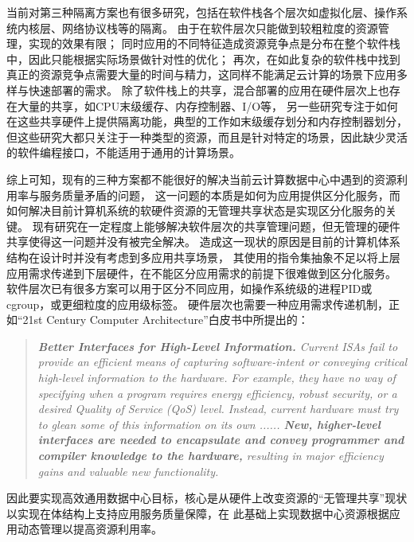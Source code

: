 当前对第三种隔离方案也有很多研究，包括在软件栈各个层次如虚拟化层\cite{}、操作系统内核层\cite{}、网络协议栈\cite{}等的隔离。
由于在软件层次只能做到较粗粒度的资源管理，实现的效果有限；
同时应用的不同特征造成资源竞争点是分布在整个软件栈中，因此只能根据实际场景做针对性的优化；
再次，在如此复杂的软件栈中找到真正的资源竞争点需要大量的时间与精力，这同样不能满足云计算的场景下应用多样与快速部署的需求。
除了软件栈上的共享，混合部署的应用在硬件层次上也存在大量的共享，如CPU末级缓存、内存控制器、I/O等，
另一些研究专注于如何在这些共享硬件上提供隔离功能，典型的工作如末级缓存划分\cite{}和内存控制器划分\cite{}，
但这些研究大都只关注于一种类型的资源，而且是针对特定的场景，因此缺少灵活的软件编程接口，不能适用于通用的计算场景。

综上可知，现有的三种方案都不能很好的解决当前云计算数据中心中遇到的资源利用率与服务质量矛盾的问题，
这一问题的本质是如何为应用提供区分化服务，而如何解决目前计算机系统的软硬件资源的无管理共享状态是实现区分化服务的关键。
现有研究在一定程度上能够解决软件层次的共享管理问题，但无管理的硬件共享使得这一问题并没有被完全解决。
造成这一现状的原因是目前的计算机体系结构在设计时并没有考虑到多应用共享场景，
其使用的指令集抽象不足以将上层应用需求传递到下层硬件，在不能区分应用需求的前提下很难做到区分化服务。
软件层次已有很多方案可以用于区分不同应用，如操作系统级的进程PID或cgroup，或更细粒度的应用级标签。%
硬件层次也需要一种应用需求传递机制，正如“21st Century Computer Architecture”白皮书中所提出的：

\begin{quotation} 
\emph{\textbf{Better Interfaces for High-Level Information.}
Current ISAs fail to provide an efficient means of capturing software-intent or conveying critical high-level information to the hardware.
For example, they have no way of specifying when a program requires energy efficiency, robust security, or a desired Quality of Service (QoS) level.
Instead, current hardware must try to glean some of this information on its own ......
\textbf{New, higher-level interfaces are needed to encapsulate and convey programmer and compiler knowledge to the hardware,}
resulting in major efficiency gains and valuable new functionality.}\cite{21st_architecture}
\end{quotation}

因此要实现高效通用数据中心目标，核心是从硬件上改变资源的“无管理共享”现状以实现在体结构上支持应用服务质量保障，在
此基础上实现数据中心资源根据应用动态管理以提高资源利用率。

